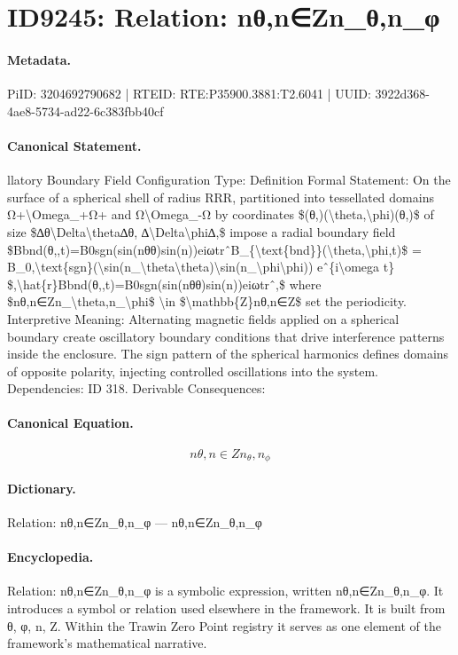 \section*{ID9245: Relation: nθ,n∈Zn\_θ,n\_φ}
\paragraph{Metadata.}
PiID: 3204692790682 | RTEID: RTE:P35900.3881:T2.6041 | UUID: 3922d368-4ae8-5734-ad22-6c383fbb40cf

\paragraph{Canonical Statement.}
llatory Boundary Field Configuration Type: Definition Formal Statement: On the surface of a spherical shell of radius RRR, partitioned into tessellated domains Ω+\textbackslash{}Omega\_+Ω+ and Ω\textbackslash{}Omega\_-Ω by coordinates \$(θ,)(\textbackslash{}theta,\textbackslash{}phi)(θ,)\$ of size \$∆θ\textbackslash{}Delta\textbackslash{}theta∆θ, ∆\textbackslash{}Delta\textbackslash{}phi∆,\$ impose a radial boundary field \$Bbnd(θ,,t)=B0sgn(sin(nθθ)sin(n))eiωtrˆB\_\{\textbackslash{}text\{bnd\}\}(\textbackslash{}theta,\textbackslash{}phi,t)\$ = B\_0,\textbackslash{}text\{sgn\}(\textbackslash{}sin(n\_\textbackslash{}theta\textbackslash{}theta)\textbackslash{}sin(n\_\textbackslash{}phi\textbackslash{}phi)) eˆ\{i\textbackslash{}omega t\} \$,\textbackslash{}hat\{r\}Bbnd(θ,,t)=B0sgn(sin(nθθ)sin(n))eiωtrˆ,\$ where \$nθ,n∈Zn\_\textbackslash{}theta,n\_\textbackslash{}phi\$ \textbackslash{}in \$\textbackslash{}mathbb\{Z\}nθ,n∈Z\$ set the periodicity. Interpretive Meaning: Alternating magnetic fields applied on a spherical boundary create oscillatory boundary conditions that drive interference patterns inside the enclosure. The sign pattern of the spherical harmonics defines domains of opposite polarity, injecting controlled oscillations into the system. Dependencies: ID 318. Derivable Consequences:

\paragraph{Canonical Equation.}
\[
nθ,n∈Zn_\theta,n_\phi
\]

\paragraph{Dictionary.}
Relation: nθ,n∈Zn\_θ,n\_φ — nθ,n∈Zn\_θ,n\_φ

\paragraph{Encyclopedia.}
Relation: nθ,n∈Zn\_θ,n\_φ is a symbolic expression, written nθ,n∈Zn\_θ,n\_φ. It introduces a symbol or relation used elsewhere in the framework. It is built from θ, φ, n, Z. Within the Trawin Zero Point registry it serves as one element of the framework's mathematical narrative.
